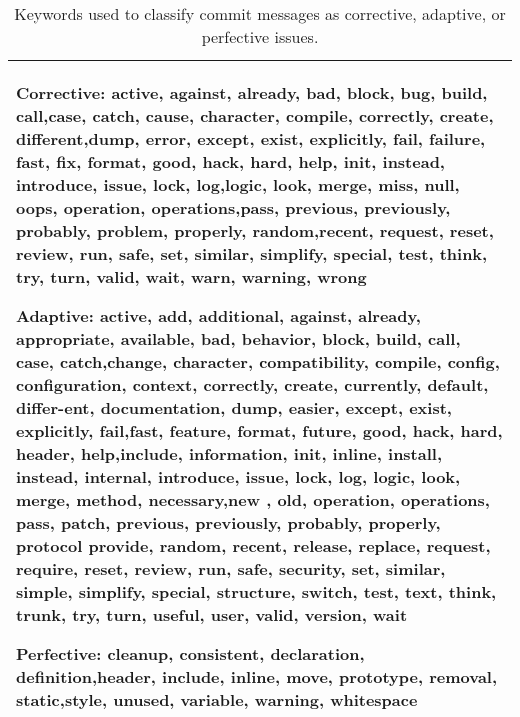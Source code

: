 
\begin{table}
\caption{Keywords used to classify commit messages as corrective, adaptive,  or perfective issues.}\label{tab:words}
\scriptsize
\vspace{-10pt}
\begin{tabular}{|p{.95\linewidth}|}\hline
Corrective: active, against, already, bad, block, bug, build, call,case, catch, cause, character, compile, correctly, create, different,dump, error, except, exist, explicitly, fail, failure, fast, fix, format, good, hack, hard, help, init, instead, introduce, issue, lock, log,logic, look, merge, miss, null, oops, operation, operations,pass, previous, previously, probably, problem, properly, random,recent, request, reset, review, run, safe, set, similar, simplify, special, test, think, try, turn, valid, wait, warn, warning, wrong 
\vspace{0.1cm}

Adaptive: active, add, additional, against, already, appropriate, available, bad, behavior, block, build, call, case, catch,change, character, compatibility, compile, config, configuration, context, correctly, create, currently, default, differ-ent, documentation, dump, easier, except, exist, explicitly, fail,fast, feature, format, future, good, hack, hard, header, help,include, information, init, inline, install, instead, internal, introduce, issue, lock, log, logic, look, merge, method, necessary,new , old, operation, operations, pass, patch, previous, previously, probably, properly, protocol provide, random, recent, release, replace, request, require, reset, review, run, safe, security, set, similar, simple, simplify, special, structure, switch, test, text, think, trunk, try, turn, useful, user, valid, version, wait 
\vspace{0.1cm}

Perfective: cleanup, consistent, declaration, definition,header, include, inline, move, prototype, removal, static,style, unused, variable, warning, whitespace 
\\\hline
\end{tabular}
\vspace{-10pt}
\end{table}
